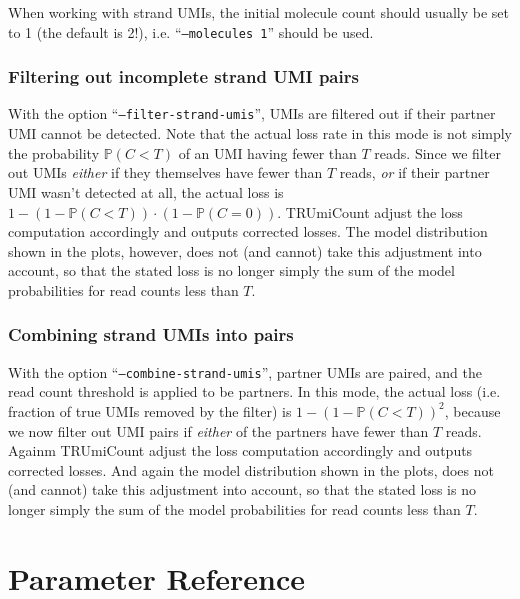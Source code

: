 \documentclass[10pt]{article}
\begin{document}
When working with strand UMIs, the initial molecule count should usually be set to 1 (the default is 2!), i.e. ``\texttt{--molecules 1}'' should be used.

\subsubsection*{Filtering out incomplete strand UMI pairs}

With the option ``\texttt{--filter-strand-umis}'', UMIs are filtered out if their partner UMI cannot be detected. Note that the actual loss rate in this mode is not simply the probability $\mathbb{P}(C < T)$ of an UMI having fewer than $T$ reads. Since we filter out UMIs \emph{either} if they themselves have fewer than $T$ reads, \emph{or} if their partner UMI wasn't detected at all, the actual loss is $1 - (1 - \mathbb{P}(C < T))\cdot (1 - \mathbb{P}(C=0))$. TRUmiCount adjust the loss computation accordingly and outputs corrected losses. The model distribution shown in the plots, however, does not (and cannot) take this adjustment into account, so that the stated loss is no longer simply the sum of the model probabilities for read counts less than $T$.

\subsubsection*{Combining strand UMIs into pairs}

With the option ``\texttt{--combine-strand-umis}'', partner UMIs are paired, and the read count threshold is applied to be partners. In this mode, the actual loss (i.e. fraction of true UMIs removed by the filter) is $1 - (1-\mathbb{P}(C < T))^2$, because we now filter out UMI pairs if \emph{either} of the partners have fewer than $T$ reads. Againm TRUmiCount adjust the loss computation accordingly and outputs corrected losses. And again the model distribution shown in the plots, does not (and cannot) take this adjustment into account, so that the stated loss is no longer simply the sum of the model probabilities for read counts less than $T$.

\pagebreak
\section{Parameter Reference}

\begin{description}

\end{description}
\end{document}
